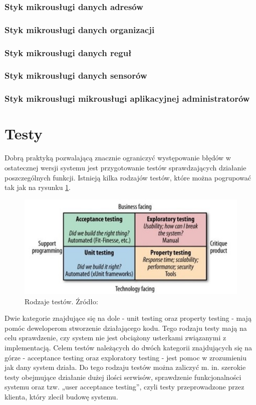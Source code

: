 \documentclass[11pt, a4]{article} %
\begin{document}
\subsubsection{Styk mikrousługi danych adresów}
\subsubsection{Styk mikrousługi danych organizacji}
\subsubsection{Styk mikrousługi danych reguł}
\subsubsection{Styk mikrousługi danych sensorów}
\subsubsection{Styk mikrousługi mikrousługi aplikacyjnej administratorów}
\section{Testy}

Dobrą praktyką pozwalającą znacznie ograniczyć występowanie błędów w ostatecznej 
wersji systemu jest przygotowanie testów sprawdzających działanie poszczególnych 
funkcji. Istnieją kilka rodzajów testów, które można pogrupować tak jak na rysunku
\ref{fig:test-types}.

\begin{figure}[h]
    \centering
    \includegraphics[width=1\textwidth]{test_types.jpg}
    \caption{Rodzaje testów. Źródło: \parencite{newman:2015ap}}
    \label{fig:test-types}
\end{figure}

Dwie kategorie znajdujące się na dole - unit testing oraz property testing - mają 
pomóc deweloperom stworzenie działającego kodu. Tego rodzaju testy mają na celu 
sprawdzenie, czy system nie jest obciążony usterkami związanymi z implementacją. 
Celem testów należących do dwóch kategorii znajdujących się na górze - acceptance 
testing oraz exploratory testing - jest pomoc w zrozumieniu jak dany system działa. 
Do tego rodzaju testów można zaliczyć m. in. szerokie testy obejmujące działanie dużej 
ilości serwisów, sprawdzenie funkcjonalności systemu oraz tzw. „user acceptance 
testing”, czyli testy przeprowadzone przez klienta, który zlecił budowę systemu.
\end{document}
